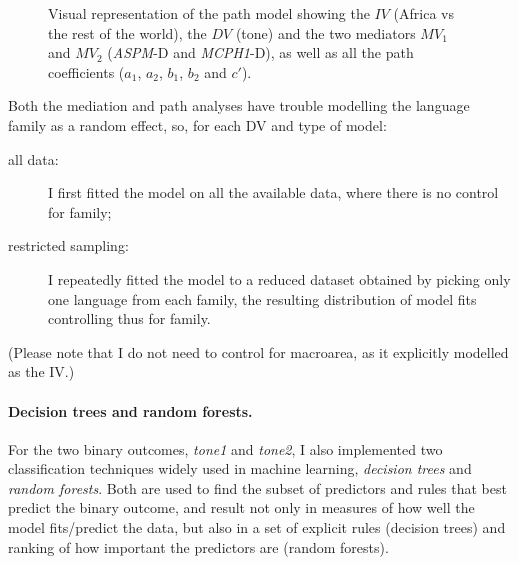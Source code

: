 \documentclass[twoside,onecolumn]{article}
\begin{document}
\begin{figure}[h]
  \centering


  \caption{Visual representation of the path model showing the $IV$ (Africa vs the rest of the world), the $DV$ (tone) and the two mediators $MV_1$ and $MV_2$ (\textit{ASPM}-D and \textit{MCPH1}-D), as well as all the path coefficients ($a_1$, $a_2$, $b_1$, $b_2$ and $c'$). }
  \label{Fig:path_analysis}
\end{figure}

Both the mediation and path analyses have trouble modelling the language family as a random effect, so, for each DV and type of model:

\begin{description}
  \item[all data:] I first fitted the model on all the available data, where there is no control for family;
  \item[restricted sampling:] I repeatedly fitted the model to a reduced dataset obtained by picking only one language from each family, the resulting distribution of model fits controlling thus for family.
\end{description}

(Please note that I do not need to control for macroarea, as it explicitly modelled as the IV.)


\paragraph{Decision trees and random forests.}

For the two binary outcomes, \textit{tone1} and \textit{tone2}, I also implemented two classification techniques widely used in machine learning, \emph{decision trees} and \emph{random forests}.
Both are used to find the subset of predictors and rules that best predict the binary outcome, and result not only in measures of how well the model fits/predict the data, but also in a set of explicit rules (decision trees) and ranking of how important the predictors are (random forests).
\end{document}
